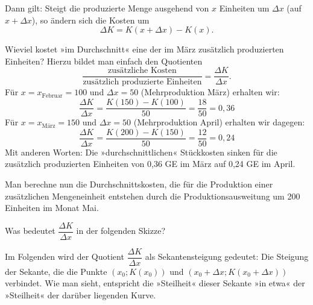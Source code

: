 Dann gilt: Steigt die produzierte Menge ausgehend von $x$ Einheiten um $\Delta x$ (auf $x + \Delta x$), so ändern sich die Kosten um
\[ \Delta K = K(x + \Delta x) - K(x) . \]

Wieviel kostet »im Durchschnitt« eine der im März zusätzlich produzierten Einheiten? Hierzu bildet man einfach den Quotienten
\[ \frac{\text{zusätzliche Kosten}}{\text{zusätzlich produzierte Einheiten}} = \frac{\Delta K}{\Delta x} . \]
Für $x = x_{\text{Februar}} = 100$ und $\Delta x = 50$ (Mehrproduktion März) erhalten wir:
\[ \frac{\Delta K}{\Delta x} = \frac{K(150) - K(100)}{50} = \frac{18}{50} = 0{,}36 \]
Für $x = x_{\text{März}} = 150$ und $\Delta x = 50$ (Mehrproduktion April) erhalten wir dagegen:
\[ \frac{\Delta K}{\Delta x} = \frac{K(200) - K(150)}{50} = \frac{12}{50} = 0{,}24 \]
Mit anderen Worten: Die »durchschnittlichen« Stückkosten sinken für die zusätzlich produzierten Einheiten von 0{,}36 GE im März auf 0{,}24 GE im April.

Man berechne nun die Durchschnittskosten, die für die Produktion einer zusätzlichen Mengeneinheit entstehen durch die Produktionsausweitung um 200 Einheiten im Monat Mai.

Was bedeutet $\dfrac{\Delta K}{\Delta x}$ in der folgenden Skizze?

\begin{center}
\end{center}

\noindent Im Folgenden wird der Quotient $\dfrac{\Delta K}{\Delta x}$ als Sekantensteigung gedeutet: Die Steigung der Sekante, die die Punkte $(x_0; K(x_0))$ und $(x_0 + \Delta x; K(x_0 + \Delta x))$ verbindet. Wie man sieht, entspricht die »Steilheit« dieser Sekante »in etwa« der »Steilheit« der darüber liegenden Kurve.

